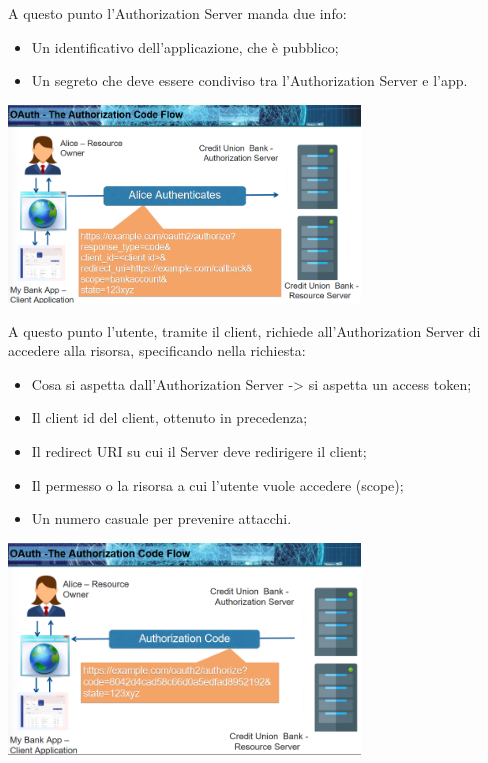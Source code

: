 \noindent A questo punto l'Authorization Server manda due info:
\begin{itemize}
    \item Un identificativo dell'applicazione, che è pubblico;
    \item Un segreto che deve essere condiviso tra l'Authorization Server e l'app.
\end{itemize}

\begin{center}
    \includegraphics[width=0.7\textwidth]{images/9.png}
\end{center}

\noindent A questo punto l'utente, tramite il client, richiede all'Authorization Server di accedere alla risorsa, specificando nella richiesta:
\begin{itemize}
    \item Cosa si aspetta dall'Authorization Server -> si aspetta un access token;
    \item Il client id del client, ottenuto in precedenza;
    \item Il redirect URI su cui il Server deve redirigere il client;
    \item Il permesso o la risorsa a cui l'utente vuole accedere (scope);
    \item Un numero casuale per prevenire attacchi. 
\end{itemize}

\begin{center}
    \includegraphics[width=0.7\textwidth]{images/10.png}
\end{center}

